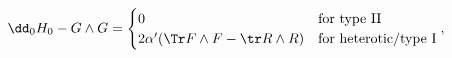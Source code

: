 \begin{equation}
   \dd_0H_0 - G\wedge G = \begin{cases} 
      0 & \text{for type II} \\ 
      2\alpha' (\Tr F\wedge F -\tr R\wedge R)& \text{for heterotic/type I} 
      \end{cases} ,
\end{equation}

